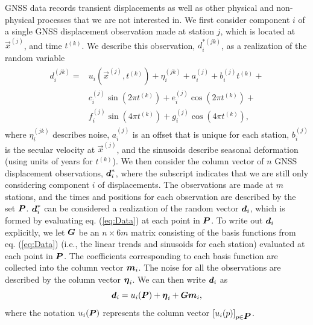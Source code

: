 \documentclass[extra,mreferee]{gji}
\begin{document}
GNSS data records transient displacements as well as other physical and non-physical processes that we are not interested in. We first consider component $i$ of a single GNSS displacement observation made at station $j$, which is located at $\vec{x}^{(j)}$, and time $t^{(k)}$. We describe this observation, $d_i^{*(jk)}$, as a realization of the random variable 
\begin{align}\label{eq:Data}
\begin{split}
d_i^{(jk)} = &u_i\left(\vec{x}^{(j)},t^{(k)}\right) + 
              \eta_i^{(jk)} + 
              a_i^{(j)} + b_i^{(j)}t^{(k)} + \\
             &c_i^{(j)}\sin\left(2 \pi t^{(k)}\right) +  
              e_i^{(j)}\cos\left(2 \pi t^{(k)}\right) + \\ 
             &f_i^{(j)}\sin\left(4 \pi t^{(k)}\right)  + 
              g_i^{(j)}\cos\left(4 \pi t^{(k)}\right), 
\end{split}
\end{align}
where $\eta_i^{(jk)}$ describes noise, $a_i^{(j)}$ is an offset that is unique for each station, $b_i^{(j)}$ is the secular velocity at $\vec{x}^{(j)}$, and the sinusoids describe seasonal deformation (using units of years for $t^{(k)}$). We then consider the column vector of $n$ GNSS displacement observations, $\mitbf{d}^*_i$, where the subscript indicates that we are still only considering component $i$ of displacements. The observations are made at $m$ stations, and the times and positions for each observation are described by the set $\mitbf{P}$. $\mitbf{d}^*_i$ can be considered a realization of the random vector $\mitbf{d}_i$, which is formed by evaluating eq. (\ref{eq:Data}) at each point in $\mitbf{P}$. To write out $\mitbf{d}_i$ explicitly, we let $\mitbf{G}$ be an $n \times 6m$ matrix consisting of the basis functions from eq. (\ref{eq:Data}) (i.e., the linear trends and sinusoids for each station) evaluated at each point in $\mitbf{P}$. The coefficients corresponding to each basis function are collected into the column vector $\mitbf{m}_i$. The noise for all the observations are described by the column vector $\mitbf{\eta}_i$. We can then write $\mitbf{d}_i$ as 
\begin{equation}\label{eq:DataVec}
\mitbf{d}_i = u_i(\mitbf{P}) + \mitbf{\eta}_i + \mitbf{G}\mitbf{m}_i,
\end{equation}
where the notation $u_i(\mitbf{P})$ represents the column vector $[u_i(p)]_{p \in \mitbf{P}}$. 
\end{document}
